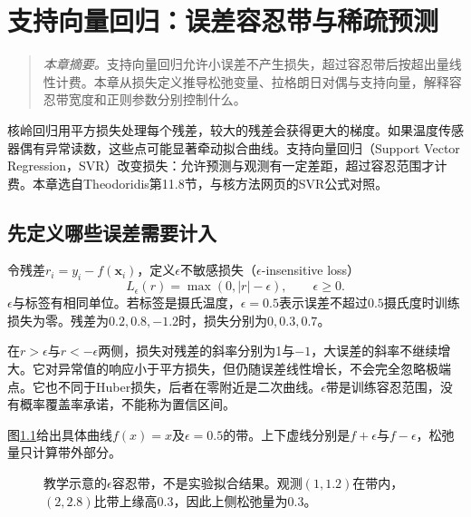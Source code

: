 \chapter{支持向量回归：误差容忍带与稀疏预测}
\label{chap:svr}
\begin{quote}\small
\textit{本章摘要。}支持向量回归允许小误差不产生损失，超过容忍带后按超出量线性计费。本章从损失定义推导松弛变量、拉格朗日对偶与支持向量，解释容忍带宽度和正则参数分别控制什么。
\end{quote}

核岭回归用平方损失处理每个残差，较大的残差会获得更大的梯度。如果温度传感器偶有异常读数，这些点可能显著牵动拟合曲线。支持向量回归（Support Vector Regression，SVR）改变损失：允许预测与观测有一定差距，超过容忍范围才计费。本章选自Theodoridis第11.8节\cite{theodoridis2015ml}，与核方法网页的SVR公式对照\cite{zheng2021kernel}。

\section{先定义哪些误差需要计入}
令残差$r_i=y_i-f(\bm x_i)$，定义$\epsilon$不敏感损失（$\epsilon$-insensitive loss）
\begin{equation}
 L_\epsilon(r)=\max(0,|r|-\epsilon),\qquad\epsilon\ge0.
 \label{eq:svr-insensitive-loss}
\end{equation}
$\epsilon$与标签有相同单位。若标签是摄氏温度，$\epsilon=0.5$表示误差不超过$0.5$摄氏度时训练损失为零。残差为$0.2,0.8,-1.2$时，损失分别为$0,0.3,0.7$。

在$r>\epsilon$与$r<-\epsilon$两侧，损失对残差的斜率分别为1与$-1$，大误差的斜率不继续增大。它对异常值的响应小于平方损失，但仍随误差线性增长，不会完全忽略极端点。它也不同于Huber损失，后者在零附近是二次曲线。$\epsilon$带是训练容忍范围，没有概率覆盖率承诺，不能称为置信区间。

图\ref{fig:svr-tube}给出具体曲线$f(x)=x$及$\epsilon=0.5$的带。上下虚线分别是$f+\epsilon$与$f-\epsilon$，松弛量只计算带外部分。
\begin{figure}[htbp]
\centering
{}
\caption{教学示意的$\epsilon$容忍带，不是实验拟合结果。观测$(1,1.2)$在带内，$(2,2.8)$比带上缘高0.3，因此上侧松弛量为0.3。}
\label{fig:svr-tube}
\end{figure}

